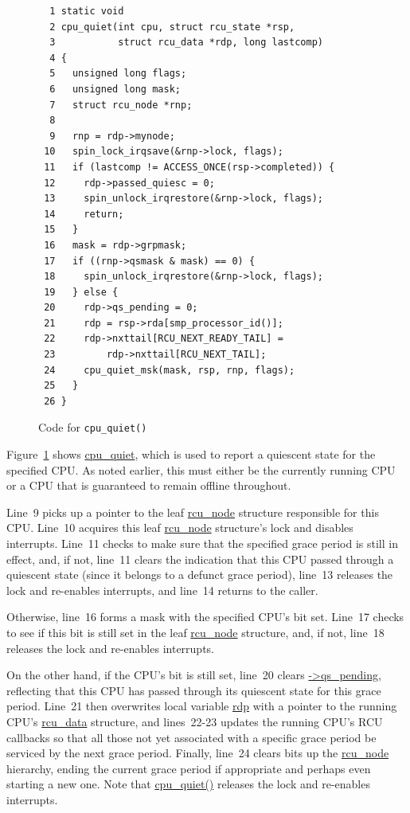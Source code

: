 \begin{figure}[tbp]
{ \scriptsize
\begin{verbatim}
  1 static void
  2 cpu_quiet(int cpu, struct rcu_state *rsp,
  3           struct rcu_data *rdp, long lastcomp)
  4 {
  5   unsigned long flags;
  6   unsigned long mask;
  7   struct rcu_node *rnp;
  8 
  9   rnp = rdp->mynode;
 10   spin_lock_irqsave(&rnp->lock, flags);
 11   if (lastcomp != ACCESS_ONCE(rsp->completed)) {
 12     rdp->passed_quiesc = 0;
 13     spin_unlock_irqrestore(&rnp->lock, flags);
 14     return;
 15   }
 16   mask = rdp->grpmask;
 17   if ((rnp->qsmask & mask) == 0) {
 18     spin_unlock_irqrestore(&rnp->lock, flags);
 19   } else {
 20     rdp->qs_pending = 0;
 21     rdp = rsp->rda[smp_processor_id()];
 22     rdp->nxttail[RCU_NEXT_READY_TAIL] =
 23         rdp->nxttail[RCU_NEXT_TAIL];
 24     cpu_quiet_msk(mask, rsp, rnp, flags);
 25   }
 26 }
\end{verbatim}
}
\caption{Code for {\tt cpu\_quiet()}}
\label{fig:app:rcuimpl:rcutreewt:Code for cpu-quiet}
\end{figure}

Figure~\ref{fig:app:rcuimpl:rcutreewt:Code for cpu-quiet}
shows \url{cpu_quiet}, which is used to report a quiescent state
for the specified CPU.
As noted earlier, this must either be the currently running CPU
or a CPU that is guaranteed to remain offline throughout.

Line~9 picks up a pointer to the leaf \url{rcu_node} structure
responsible for this CPU.
Line~10 acquires this leaf \url{rcu_node} structure's lock and
disables interrupts.
Line~11 checks to make sure that the specified grace period is
still in effect, and, if not, line~11 clears the indication that
this CPU passed through a quiescent state (since it belongs to
a defunct grace period), line~13 releases the lock and re-enables
interrupts, and line~14 returns to the caller.

Otherwise, line~16 forms a mask with the specified CPU's bit set.
Line~17 checks to see if this bit is still set in the leaf
\url{rcu_node} structure, and, if not, line~18 releases the lock
and re-enables interrupts.

On the other hand, if the CPU's bit is still set, line~20 clears
\url{->qs_pending}, reflecting that this CPU has passed through
its quiescent state for this grace period.
Line~21 then overwrites local variable \url{rdp} with a pointer to
the running CPU's \url{rcu_data} structure, and lines~22-23
updates the running CPU's RCU callbacks so that all those not yet
associated with a specific grace period
be serviced by the next grace period.
Finally, line~24 clears bits up the \url{rcu_node} hierarchy,
ending the current grace period if appropriate and perhaps even
starting a new one.
Note that \url{cpu_quiet()} releases the lock and re-enables interrupts.

